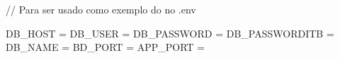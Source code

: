 // Para ser usado como exemplo do no .env 

DB_HOST = 
DB_USER = 
DB_PASSWORD = 
DB_PASSWORDITB = 
DB_NAME = 
BD_PORT = 
APP_PORT = 